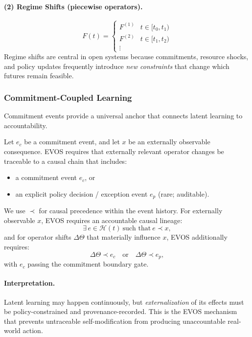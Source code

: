 \documentclass[11pt]{article}
\begin{document}
\paragraph{(2) Regime Shifts (piecewise operators).}
\[
F(t) =
\begin{cases}
F^{(1)} & t \in [t_0, t_1) \\
F^{(2)} & t \in [t_1, t_2) \\
\vdots &
\end{cases}
\]
Regime shifts are central in open systems because commitments, resource shocks, and policy
updates frequently introduce \emph{new constraints} that change which futures remain feasible.

\subsubsection{Commitment-Coupled Learning}
\label{sec:commitment-coupled-learning}

Commitment events provide a universal anchor that connects latent learning to accountability.

Let $e_c$ be a commitment event, and let $x$ be an externally observable consequence.
EVOS requires that externally relevant operator changes be traceable to a causal chain that includes:
\begin{itemize}
  \item a commitment event $e_c$, or
  \item an explicit policy decision / exception event $e_p$ (rare; auditable).
\end{itemize}

We use $\prec$ for causal precedence within the event history.
For externally observable $x$, EVOS requires an accountable causal lineage:
\[
\exists\, e \in \mathcal{H}(t)\ \text{such that}\ e \prec x,
\]
and for operator shifts $\Delta\Theta$ that materially influence $x$, EVOS additionally requires:
\[
\Delta\Theta \prec e_c \quad \text{or} \quad \Delta\Theta \prec e_p,
\]
with $e_c$ passing the commitment boundary gate.

\paragraph{Interpretation.}
Latent learning may happen continuously, but \emph{externalization} of its effects must be
policy-constrained and provenance-recorded. This is the EVOS mechanism that prevents
untraceable self-modification from producing unaccountable real-world action.
\end{document}
